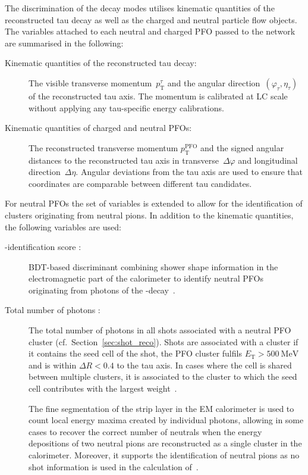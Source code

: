 The discrimination of the decay modes utilises kinematic quantities of the
reconstructed tau decay as well as the charged and neutral particle flow
objects. The variables attached to each neutral and charged PFO passed to the
network are summarised in the following:
\begin{description}
\item[Kinematic quantities of the reconstructed tau decay:] The visible
  transverse momentum~$p_\text{T}^\tau$ and the angular
  direction~$(\varphi_\tau, \eta_\tau)$ of the reconstructed tau axis. The
  momentum is calibrated at LC scale without applying any tau-specific energy
  calibrations.

\item[Kinematic quantities of charged and neutral PFOs:] The reconstructed
  transverse momentum $p_\text{T}^\text{PFO}$ and the signed angular distances
  to the reconstructed tau axis in transverse~$\Delta\varphi$ and longitudinal
  direction~$\Delta\eta$. Angular deviations from the tau axis are used to
  ensure that coordinates are comparable between different tau candidates.
\end{description}
For neutral PFOs the set of variables is extended to allow for the
identification of clusters originating from neutral pions. In addition to the
kinematic quantities, the following variables are used:
\begin{description}
\item[-identification score :]
  BDT-based discriminant combining shower shape information in the
  electromagnetic part of the calorimeter to identify neutral PFOs originating
  from photons of the -decay~\cite{atlas:taurec:decaymodes}.

\item[Total number of photons :] The total
  number of photons in all shots associated with a neutral PFO cluster (cf.\
  Section~\ref{sec:shot_reco}). Shots are associated with a cluster if it
  contains the seed cell of the shot, the PFO cluster fulfils
  $E_\text{T} > \SI{500}{\mega\electronvolt}$ and is within $\Delta R < 0.4$ to
  the tau axis. In cases where the cell is shared between multiple clusters, it
  is associated to the cluster to which the seed cell contributes with the
  largest weight~\cite{athena}.

  The fine segmentation of the strip layer in the EM calorimeter is used to
  count local energy maxima created by individual photons, allowing in some
  cases to recover the correct number of neutrals when the energy depositions of
  two neutral pions are reconstructed as a single cluster in the calorimeter.
  Moreover, it supports the identification of neutral pions as no shot
  information is used in the calculation of~.
\end{description}


